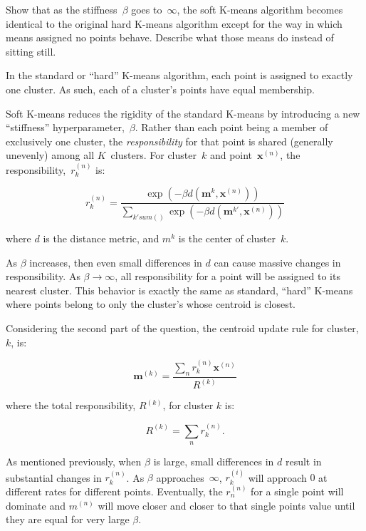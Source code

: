\newpage
\begin{problem}{20}{2}{2}
  Show that as the stiffness~$\beta$ goes to~$\infty$, the soft K-means algorithm becomes identical to the original hard K-means algorithm except for the way in which means assigned no points behave.  Describe what those means do instead of sitting still.
\end{problem}

In the standard or ``hard'' K-means algorithm, each point is assigned to exactly one cluster.  As such, each of a cluster's points have equal membership.

Soft K-means reduces the rigidity of the standard K-means by introducing a new ``stiffness'' hyperparameter,~$\beta$.  Rather than each point being a member of exclusively one cluster, the \textit{responsibility} for that point is shared (generally unevenly) among all $K$~clusters.  For cluster~$k$ and point~$\textbf{x}^{(n)}$, the responsibility,~$r_{k}^{(n)}$ is:

\begin{equation}
  r_k^{(n)} = \frac{\exp(-\beta d(\textbf{m}^{k}, \textbf{x}^{(n)}))}{\sum_{k'sum()} \exp(-\beta d(\textbf{m}^{k'}, \textbf{x}^{(n)}))}
\end{equation}

\noindent
where $d$ is the distance metric, and $m^{k}$ is the center of cluster~$k$.

As $\beta$ increases, then even small differences in $d$ can cause massive changes in responsibility.  As ${\beta \rightarrow \infty}$, all responsibility for a point will be assigned to its nearest cluster.  This behavior is exactly the same as standard, ``hard'' K-means where points belong to only the cluster's whose centroid is closest.

Considering the second part of the question, the centroid update rule for cluster,~$k$, is:

\[ \mathbf{m}^{(k)} = \frac{\sum_{n}r^{(n)}_k \mathbf{x}^{(n)}}{R^{(k)}} \]

\noindent
where the total responsibility, $R^{(k)}$, for cluster $k$ is:

\[ R^{(k)}=\sum_{n} r_{k}^{(n)} \text{.} \]

As mentioned previously, when $\beta$ is large, small differences in $d$ result in substantial changes in $r_{k}^{(n)}$. As $\beta$ approaches~$\infty$, $r_{k}^{(i)}$ will approach $0$ at different rates for different points.  Eventually, the $r_{n}^{(n)}$ for a single point will dominate and $m^{(n)}$ will move closer and closer to that single points value until they are equal for very large $\beta$.